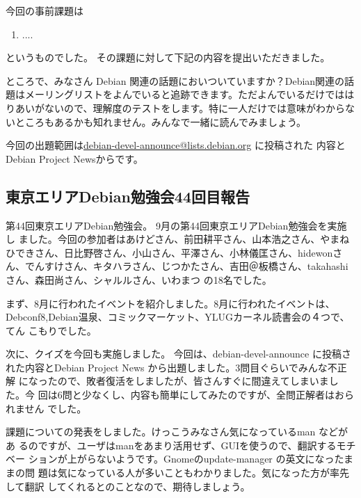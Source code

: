 \documentclass[mingoth,a4paper]{jsarticle}
\begin{document}

今回の事前課題は
\begin{enumerate}
 \item ....
\end{enumerate}
というものでした。
その課題に対して下記の内容を提出いただきました。



ところで、みなさん Debian 関連の話題においついていますか？Debian関連の話
題はメーリングリストをよんでいると追跡できます。ただよんでいるだけではは
りあいがないので、理解度のテストをします。特に一人だけでは意味がわからな
いところもあるかも知れません。みんなで一緒に読んでみましょう。

今回の出題範囲は\url{debian-devel-announce@lists.debian.org} に投稿された
内容とDebian Project Newsからです。

\subsection{東京エリアDebian勉強会44回目報告}

第44回東京エリアDebian勉強会。 9月の第44回東京エリアDebian勉強会を実施し
ました。今回の参加者はあけどさん、前田耕平さん、山本浩之さん、やまねひできさん、日比野啓さん、小山さん、平澤さん、小林儀匡さん、hidewonさん、でんすけさん、キタハラさん、じつかたさん、吉田＠板橋さん、takahashiさん、森田尚さん、シャルルさん、いわまつ の18名でした。

まず、8月に行われたイベントを紹介しました。8月に行われたイベントは、
Debconf8,Debian温泉、コミックマーケット、YLUGカーネル読書会の４つで、てん
こもりでした。

次に、クイズを今回も実施しました。 今回は、debian-devel-announce に投稿さ
れた内容とDebian Project News から出題しました。3問目ぐらいでみんな不正解
になったので、敗者復活をしましたが、皆さんすぐに間違えてしまいました。今
回は6問と少なくし、内容も簡単にしてみたのですが、全問正解者はおられません
でした。

課題についての発表をしました。けっこうみなさん気になっているman などがあ
るのですが、ユーザはmanをあまり活用せず、GUIを使うので、翻訳するモチベー
ションが上がらないようです。Gnomeのupdate-manager の英文になったままの問
題は気になっている人が多いこともわかりました。気になった方が率先して翻訳
してくれるとのことなので、期待しましょう。
\end{document}
